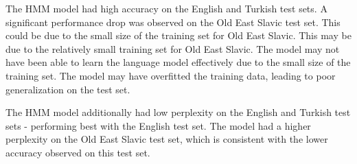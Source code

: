 \documentclass[a4paper, 12pt]{article}
\begin{document}
The HMM model had high accuracy on the English and Turkish test sets. A significant performance drop was observed on the Old East Slavic test set. This could be due to the small size of the training set for Old East Slavic. This may be due to the relatively small training set for Old East Slavic. The model may not have been able to learn the language model effectively due to the small size of the training set. The model may have overfitted the training data, leading to poor generalization on the test set.

The HMM model additionally had low perplexity on the English and Turkish test sets - performing best with the English test set. The model had a higher perplexity on the Old East Slavic test set, which is consistent with the lower accuracy observed on this test set.

\end{document}
